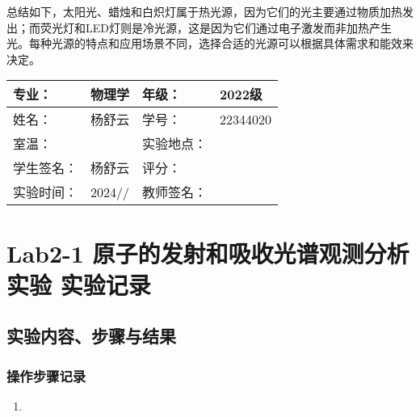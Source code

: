 \documentclass[dvipsnames, svgnames,a4paper,11pt]{article}
\begin{document}
	总结如下，太阳光、蜡烛和白炽灯属于热光源，因为它们的光主要通过物质加热发出；而荧光灯和LED灯则是冷光源，这是因为它们通过电子激发而非加热产生光。每种光源的特点和应用场景不同，选择合适的光源可以根据具体需求和能效来决定。
	
	
	
	
	
	\clearpage
	
	\begin{table}
		\renewcommand\arraystretch{1.7}
		\centering
		\begin{tabularx}{\textwidth}{|X|X|X|X|}
			\hline
			专业： & 物理学 & 年级： & 2022级 \\
			\hline
			姓名： & 杨舒云 & 学号： & 22344020\\
			\hline
			室温： &  & 实验地点： &  \\
			\hline
			学生签名：& 杨舒云 & 评分： &\\
			\hline
			实验时间：& 2024// & 教师签名：&\\
			\hline
		\end{tabularx}
	\end{table}
	
	\section{Lab2-1 原子的发射和吸收光谱观测分析实验  \quad\heiti 实验记录}
	
	\subsection{实验内容、步骤与结果}
	
	\subsubsection{操作步骤记录}
	\begin{enumerate}
		\item 
	\end{enumerate}	
	
\end{document}
